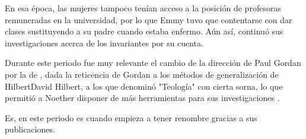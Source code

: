 En esa época, las mujeres tampoco tenían acceso a la posición de profesoras remuneradas en la universidad, por lo que Emmy tuvo que contentarse con dar clases sustituyendo a su padre cuando estaba enfermo. Aún así, continuó sus investigaciones acerca de los invariantes por su cuenta.

Durante este periodo fue muy relevante el cambio de la dirección de Paul Gordan por la de , dada la reticencia de Gordan a los métodos de generalización de {Hilbert}{David Hilbert}, a los que denominó "Teología" con cierta sorna, lo que permitió a Noether disponer de más herramientas para sus investigaciones \citep{Weyl}.

Es, en este periodo es cuando empieza a tener renombre gracias a sus publicaciones.

